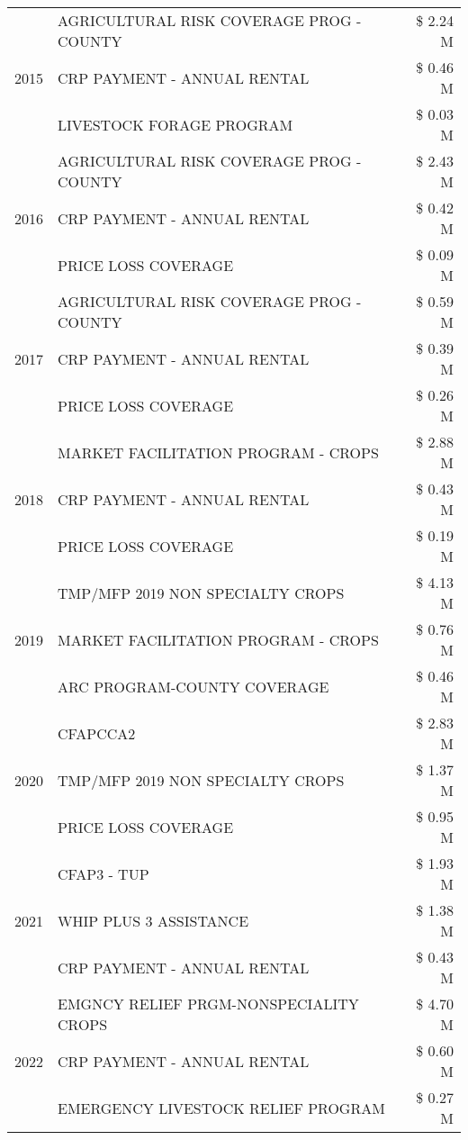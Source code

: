 \begin{tabular}{llr}
\cline{1-3}
\multirow[t]{3}{*}{2015} & AGRICULTURAL RISK COVERAGE PROG - COUNTY & \$ 2.24 M \\
 & CRP PAYMENT - ANNUAL RENTAL & \$ 0.46 M \\
 & LIVESTOCK FORAGE PROGRAM & \$ 0.03 M \\
\cline{1-3}
\multirow[t]{3}{*}{2016} & AGRICULTURAL RISK COVERAGE PROG - COUNTY & \$ 2.43 M \\
 & CRP PAYMENT - ANNUAL RENTAL & \$ 0.42 M \\
 & PRICE LOSS COVERAGE & \$ 0.09 M \\
\cline{1-3}
\multirow[t]{3}{*}{2017} & AGRICULTURAL RISK COVERAGE PROG - COUNTY & \$ 0.59 M \\
 & CRP PAYMENT - ANNUAL RENTAL & \$ 0.39 M \\
 & PRICE LOSS COVERAGE & \$ 0.26 M \\
\cline{1-3}
\multirow[t]{3}{*}{2018} & MARKET FACILITATION PROGRAM - CROPS & \$ 2.88 M \\
 & CRP PAYMENT - ANNUAL RENTAL & \$ 0.43 M \\
 & PRICE LOSS COVERAGE & \$ 0.19 M \\
\cline{1-3}
\multirow[t]{3}{*}{2019} & TMP/MFP 2019 NON SPECIALTY CROPS & \$ 4.13 M \\
 & MARKET FACILITATION PROGRAM - CROPS & \$ 0.76 M \\
 & ARC PROGRAM-COUNTY COVERAGE & \$ 0.46 M \\
\cline{1-3}
\multirow[t]{3}{*}{2020} & CFAPCCA2 & \$ 2.83 M \\
 & TMP/MFP 2019 NON SPECIALTY CROPS & \$ 1.37 M \\
 & PRICE LOSS COVERAGE & \$ 0.95 M \\
\cline{1-3}
\multirow[t]{3}{*}{2021} & CFAP3 - TUP & \$ 1.93 M \\
 & WHIP PLUS 3 ASSISTANCE & \$ 1.38 M \\
 & CRP PAYMENT - ANNUAL RENTAL & \$ 0.43 M \\
\cline{1-3}
\multirow[t]{3}{*}{2022} & EMGNCY RELIEF PRGM-NONSPECIALITY CROPS & \$ 4.70 M \\
 & CRP PAYMENT - ANNUAL RENTAL & \$ 0.60 M \\
 & EMERGENCY LIVESTOCK RELIEF PROGRAM & \$ 0.27 M \\
\cline{1-3}
\bottomrule
\end{tabular}
